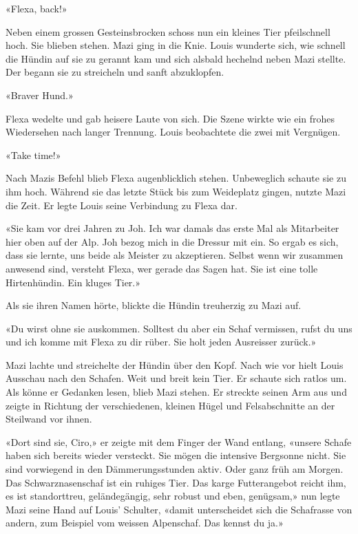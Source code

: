 «Flexa, back!»

Neben einem grossen Gesteinsbrocken schoss nun ein kleines Tier
pfeilschnell hoch. Sie blieben stehen.
Mazi ging in die Knie. Louis wunderte sich, wie schnell die Hündin auf sie zu gerannt kam
und sich alsbald hechelnd neben Mazi stellte. Der begann sie zu
streicheln und sanft abzuklopfen.

«Braver Hund.»

Flexa wedelte und gab heisere Laute von sich. Die Szene wirkte wie ein
frohes Wiedersehen nach langer Trennung. Louis beobachtete die zwei mit Vergnügen.

«Take time!»

Nach Mazis Befehl blieb Flexa augenblicklich stehen. Unbeweglich schaute
sie zu ihm hoch.
Während sie das letzte Stück bis zum Weideplatz gingen, nutzte Mazi die
Zeit. Er legte Louis seine Verbindung zu Flexa dar.

«Sie kam vor drei Jahren zu Joh. Ich war damals das erste Mal als
Mitarbeiter hier oben auf der Alp. Joh bezog mich in die Dressur mit
ein. So ergab es sich, dass sie lernte, uns beide als Meister zu
akzeptieren. Selbst wenn wir zusammen anwesend sind, versteht Flexa, wer
gerade das Sagen hat. Sie ist eine tolle Hirtenhündin. Ein kluges Tier.»

Als sie ihren Namen hörte, blickte die Hündin treuherzig zu Mazi auf.

«Du wirst ohne sie auskommen. Solltest du aber ein Schaf vermissen,
rufst du uns und ich komme mit Flexa zu dir rüber. Sie holt jeden
Ausreisser zurück.»

Mazi lachte und streichelte der Hündin über den Kopf.
Nach wie vor hielt Louis Ausschau nach den Schafen. Weit und breit kein
Tier. Er schaute sich ratlos um. 
Als könne er Gedanken lesen, blieb Mazi stehen. Er streckte seinen Arm
aus und zeigte in Richtung der verschiedenen, kleinen Hügel und
Felsabschnitte an der Steilwand vor ihnen.

«Dort sind sie, Ciro,» er zeigte mit dem Finger der Wand entlang, «unsere
Schafe haben sich bereits wieder versteckt. Sie mögen die intensive
Bergsonne nicht. Sie sind vorwiegend in den Dämmerungsstunden aktiv.
Oder ganz früh am Morgen. Das Schwarznasenschaf ist ein ruhiges Tier.
Das karge Futterangebot reicht ihm, es ist standorttreu, geländegängig,
sehr robust und eben, genügsam,» nun legte Mazi seine Hand auf Louis’
Schulter, «damit unterscheidet sich die Schafrasse von andern, zum
Beispiel vom weissen Alpenschaf. Das kennst du ja.»

